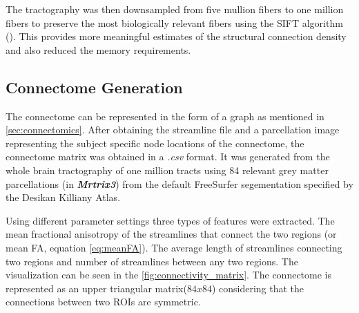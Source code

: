 \documentclass[msthesis.tex]{subfiles}
\begin{document}
The tractography was then downsampled from five mullion fibers to one million fibers to preserve the most biologically relevant fibers using the SIFT algorithm (\cite{smith2013sift}). This provides more meaningful estimates of the structural connection density and also reduced the memory requirements. 

\subsection{Connectome Generation}
\label{subsec:connectomegeneration}
The connectome can be represented in the form of a graph as mentioned in \autoref{sec:connectomics}. After obtaining the streamline file and a parcellation image representing the subject specific node locations of the connectome, the connectome matrix was obtained in a \textit{.csv} format. It was generated from the whole brain tractography of one million tracts using 84 relevant grey matter parcellations (in \textit{\textbf{Mrtrix3}}) from the default FreeSurfer segementation specified by the Desikan Killiany Atlas. 

Using different parameter settings three types of features were extracted. The mean fractional anisotropy of the streamlines that connect the two regions (or mean FA, equation \autoref{eq:meanFA}). The average length of streamlines connecting two regions and number of streamlines between any two regions. The visualization can be seen in the \autoref{fig:connectivity_matrix}. The connectome is represented as an upper triangular matrix($84 x 84$) considering that the connections between two ROIs are symmetric.
\end{document}
